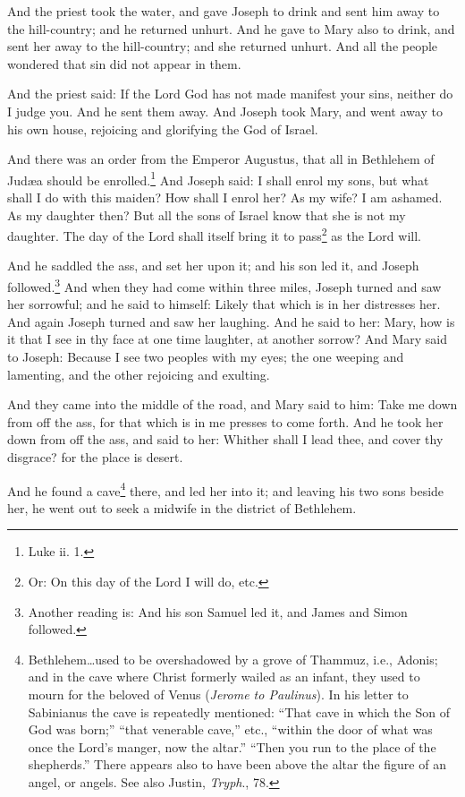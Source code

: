 \pend\pstart
And the priest took the water, and gave Joseph to drink and sent him away to the hill-country; and he returned unhurt. And he gave to Mary also to drink, and sent her away to the hill-country; and she returned unhurt. And all the people wondered that sin did not appear in them.

\pend\pstart
And the priest said: If the Lord God has not made manifest your sins, neither do I judge you. And he sent them away. And Joseph took Mary, and went away to his own house, rejoicing and glorifying the God of Israel.

\pend\pstart
{}

\pend\setcounter{pstartR}{1}\pstart
And there was an order from the Emperor Augustus, that all in Bethlehem of Judæa should be enrolled.\footnote{Luke ii. 1.} And Joseph said: I shall enrol my sons, but what shall I do with this maiden? How shall I enrol her? As my wife? I am ashamed. As my daughter then? But all the sons of Israel know that she is not my daughter. The day of the Lord shall itself bring it to pass\footnote{Or: On this day of the Lord I will do, etc.} as the Lord will.

\pend\pstart
And he saddled the ass, and set her upon it; and his son led it, and Joseph followed.\footnote{Another reading is: And his son Samuel led it, and James and Simon followed.} And when they had come within three miles, Joseph turned and saw her sorrowful; and he said to himself: Likely that which is in her distresses her. And again Joseph turned and saw her laughing. And he said to her: Mary, how is it that I see in thy face at one time laughter, at another sorrow? And Mary said to Joseph: Because I see two peoples with my eyes; the one weeping and lamenting, and the other rejoicing and exulting.

\pend\pstart
And they came into the middle of the road, and Mary said to him: Take me down from off the ass, for that which is in me presses to come forth. And he took her down from off the ass, and said to her: Whither shall I lead thee, and cover thy disgrace? for the place is desert.

\pend\pstart
{}

\pend\setcounter{pstartR}{1}\pstart
And he found a cave\footnote{Bethlehem…used to be overshadowed by a grove of Thammuz, i.e., Adonis; and in the cave where Christ formerly wailed as an infant, they used to mourn for the beloved of Venus (\textit{Jerome to Paulinus}). In his letter to Sabinianus the cave is repeatedly mentioned: ``That cave in which the Son of God was born;'' ``that venerable cave,'' etc., ``within the door of what was once the Lord's manger, now the altar.'' ``Then you run to the place of the shepherds.'' There appears also to have been above the altar the figure of an angel, or angels. See also Justin, \textit{Tryph}., 78.} there, and led her into it; and leaving his two sons beside her, he went out to seek a midwife in the district of Bethlehem.

